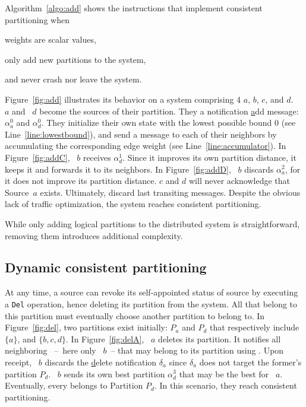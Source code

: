 Algorithm~\ref{algo:add} shows the instructions that implement
consistent partitioning when
\begin{inparaenum}[(i)]
\item weights are scalar values,
\item \processes only add new partitions to the system,
\item and \processes never crash nor leave the system.
\end{inparaenum}
Figure~\ref{fig:add} illustrates its behavior on a system comprising 4
\processes $a$, $b$, $c$, and $d$. \Process~$a$ and \Process~$d$
become the sources of their partition. They \NAMEB a notification
\underline{a}dd message: $\alpha_a^0$ and $\alpha_d^0$. They
initialize their own state with the lowest possible bound $0$ (see
Line~\ref{line:lowestbound}), and send a message to each of their
neighbors by accumulating the corresponding edge weight (see
Line~\ref{line:accumulator}). In Figure~\ref{fig:addC}, \Process~$b$
receives $\alpha_{d}^{1}$. Since it improves its own partition
distance, it keeps it and forwards it to its neighbors. In
Figure~\ref{fig:addD}, \Process~$b$ discards $\alpha_{a}^{2}$, for it
does not improve its partition distance. \Processes $c$ and $d$ will
never acknowledge that Source~$a$ exists. Ultimately, \processes
discard last transiting messages. Despite the obvious lack of traffic
optimization, the system reaches consistent partitioning.

While only adding logical partitions to the distributed system is
straightforward, removing them introduces additional complexity.

\subsection{Dynamic consistent partitioning}
\label{subsec:dynamic}


At any time, a source can revoke its self-appointed status of source
by executing a \texttt{Del} operation, hence deleting its partition
from the system. All \processes that belong to this partition must
eventually choose another partition to belong to. In
Figure~\ref{fig:del}, two partitions exist initially: $P_a$ and $P_d$
that respectively include $\{a\}$, and $\{b, c, d\}$. In
Figure~\ref{fig:delA}, \Process~$a$ deletes its partition. It notifies
all neighboring \processes~--~here only \Process~$b$~-- that may
belong to its partition using \NAMEB. Upon receipt, \Process~$b$
discards the \underline{d}elete notification $\delta_a$ since
$\delta_a$ does not target the former's partition $P_d$. \Process~$b$
sends its own best partition $\alpha_d^3$ that may be the best for
\Process~$a$. Eventually, every \process belongs to Partition
$P_d$. In this scenario, they reach consistent partitioning.

